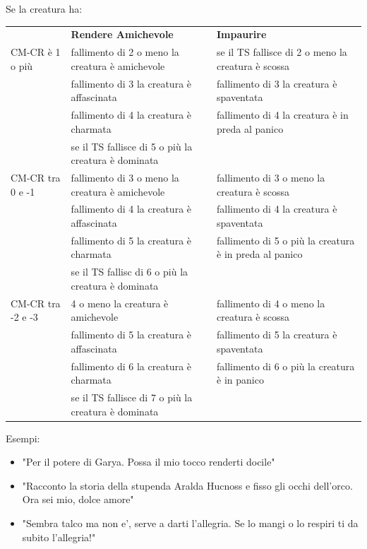 \documentclass[a4paper,11pt,twoside,openany]{book}
\begin{document}
Se la creatura ha:

\begin{tabular}{L{2.5cm} L{7cm} L{7cm}}
	\toprule
  & \textbf{Rendere Amichevole}         & \textbf{Impaurire}\\
   CM-CR è 1 o più   & fallimento di 2 o meno la creatura è amichevole     & se il TS fallisce di 2 o meno la creatura è scossa\\
   & fallimento di 3 la creatura è affascinata     & fallimento di 3 la creatura è spaventata\\
   & fallimento di 4 la creatura è charmata        & fallimento di 4 la creatura è in preda al panico\\
  & se il TS fallisce di 5 o più la creatura è dominata         & \\
 CM-CR tra 0 e -1  & fallimento di 3 o meno la creatura è amichevole   & fallimento di 3 o meno la creatura è scossa\\
 & fallimento di 4 la creatura è affascinata  & fallimento di 4 la creatura è spaventata\\
 & fallimento di 5 la creatura è charmata     & fallimento di 5 o più la creatura è in preda al panico\\
 & se il TS fallisc di 6 o più la creatura è dominata          & \\
 CM-CR tra -2 e -3 & 4 o meno la creatura è amichevole  & fallimento di 4 o meno la creatura è scossa\\
& fallimento di 5 la creatura è affascinata      & fallimento di 5 la creatura è spaventata\\
& fallimento di 6 la creatura è charmata         & fallimento di 6 o più la creatura è in panico\\
 & se il TS fallisce di 7 o più la creatura è dominata & \\
\end{tabular}


\bigskip

Esempi:
\begin{itemize}
	\item
	      "Per il potere di Garya. Possa il mio tocco renderti docile"
	\item
	      "Racconto la storia della stupenda Aralda Hucnoss e fisso gli occhi dell'orco. Ora sei mio, dolce amore"
	\item
	      "Sembra talco ma non e', serve a darti l'allegria. Se lo mangi o lo respiri ti da subito l'allegria!"
\end{itemize}
\end{document}
